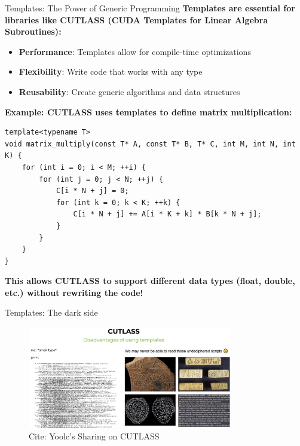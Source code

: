 \begin{frame}[fragile]{Templates: The Power of Generic Programming}
    \textbf{Templates are essential for libraries like CUTLASS (CUDA Templates for Linear Algebra Subroutines):}
    \begin{itemize}
        \item \textbf{Performance}: Templates allow for compile-time optimizations
        \item \textbf{Flexibility}: Write code that works with any type
        \item \textbf{Reusability}: Create generic algorithms and data structures
    \end{itemize}

    \textbf{Example: CUTLASS uses templates to define matrix multiplication:}
    \begin{verbatim}
template<typename T>
void matrix_multiply(const T* A, const T* B, T* C, int M, int N, int K) {
    for (int i = 0; i < M; ++i) {
        for (int j = 0; j < N; ++j) {
            C[i * N + j] = 0;
            for (int k = 0; k < K; ++k) {
                C[i * N + j] += A[i * K + k] * B[k * N + j];
            }
        }
    }
}
    \end{verbatim}

    \textbf{This allows CUTLASS to support different data types (float, double, etc.) without rewriting the code!}
\end{frame}

\begin{frame}[fragile]{Templates: The dark side}
    \begin{figure}
        \includegraphics[width=0.8\textwidth]{day8_pm/img/2-templates}
        \caption{Cite: Yoolc's Sharing on CUTLASS}
    \end{figure}
\end{frame}

